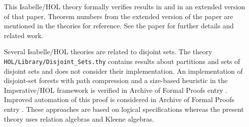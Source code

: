 \documentclass[11pt,a4paper]{article}
\begin{document}
This Isabelle/HOL theory formally verifies results in \cite{Guttmann2020b} and in an extended version of that paper.
Theorem numbers from the extended version of the paper are mentioned in the theories for reference.
See the paper for further details and related work.

Several Isabelle/HOL theories are related to disjoint sets.
The theory \texttt{HOL/Library/Disjoint\_Sets.thy} contains results about partitions and sets of disjoint sets and does not consider their implementation.
An implementation of disjoint-set forests with path compression and a size-based heuristic in the Imperative/HOL framework is verified in Archive of Formal Proofs entry \cite{LammichMeis2012}.
Improved automation of this proof is considered in Archive of Formal Proofs entry \cite{Zhan2018}.
These approaches are based on logical specifications whereas the present theory uses relation algebras and Kleene algebras.

\begin{flushleft}

\end{flushleft}



\end{document}
